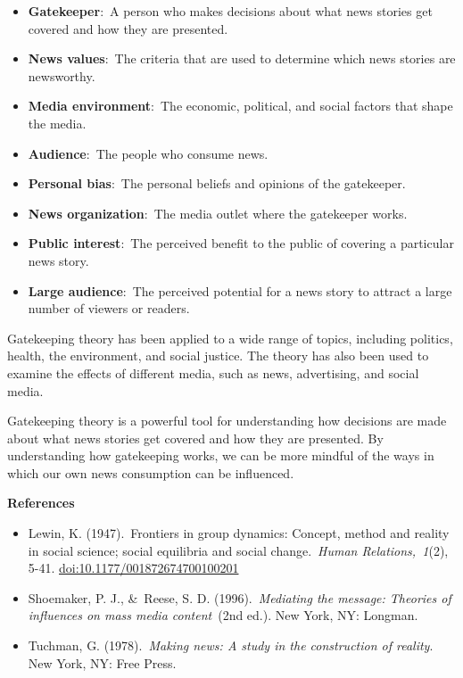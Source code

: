 \documentclass[
  b5paper]{book}
\begin{document}
\begin{itemize}
\item
  \textbf{Gatekeeper}:~A person who makes decisions about what news stories get covered and how they are presented.
\item
  \textbf{News values}:~The criteria that are used to determine which news stories are newsworthy.
\item
  \textbf{Media environment}:~The economic, political, and social factors that shape the media.
\item
  \textbf{Audience}:~The people who consume news.
\item
  \textbf{Personal bias}:~The personal beliefs and opinions of the gatekeeper.
\item
  \textbf{News organization}:~The media outlet where the gatekeeper works.
\item
  \textbf{Public interest}:~The perceived benefit to the public of covering a particular news story.
\item
  \textbf{Large audience}:~The perceived potential for a news story to attract a large number of viewers or readers.
\end{itemize}

Gatekeeping theory has been applied to a wide range of topics, including politics, health, the environment, and social justice. The theory has also been used to examine the effects of different media, such as news, advertising, and social media.

Gatekeeping theory is a powerful tool for understanding how decisions are made about what news stories get covered and how they are presented. By understanding how gatekeeping works, we can be more mindful of the ways in which our own news consumption can be influenced.

\textbf{References}

\begin{itemize}
\item
  Lewin, K. (1947).~Frontiers in group dynamics: Concept, method and reality in social science; social equilibria and social change.~\emph{Human Relations,~1}(2), 5-41. \url{doi:10.1177/001872674700100201}
\item
  Shoemaker, P. J., \&~Reese, S. D. (1996).~\emph{Mediating the message: Theories of influences on mass media content}~(2nd ed.). New York, NY: Longman.
\item
  Tuchman, G. (1978).~\emph{Making news: A study in the construction of reality}. New York, NY: Free Press.
\end{itemize}
\end{document}
